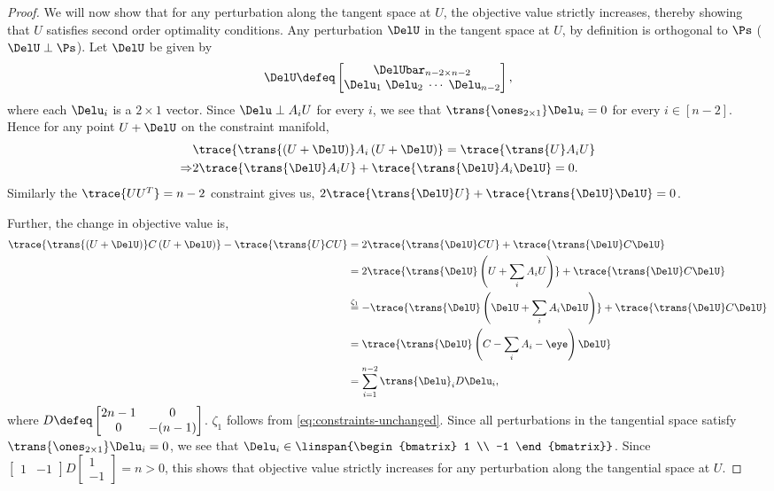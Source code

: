 \begin{proof}
We will now show that for any perturbation along the tangent space at $U$, the objective value strictly increases, thereby showing that $U$ satisfies second order optimality conditions. Any perturbation $\DelU$ in the tangent space at $U$, by definition is orthogonal to $\Ps$ ($\DelU \perp \Ps$). Let $\DelU$ be given by $$\DelU \defeq \begin{bmatrix} {\DelUbar}_{n-2 \times n-2} \\ \Delu_1 \; \Delu_2 \; \cdots \; \Delu_{n-2} \end{bmatrix},$$ where each $\Delu_i$ is a $2\times1$ vector. Since $\Delu \perp A_i U$ for every $i$, we see that $\trans{\ones_{2\times 1}}\Delu_i = 0$ for every $i \in [n-2]$. Hence for any point $U+\DelU$ on the constraint manifold,
\begin{align}
	&\trace{\trans{\left(U + \DelU\right)} A_i \left(U + \DelU\right)} = \trace{\trans{U} A_i U} \nonumber \\
	\Rightarrow & 2 \trace{\trans{\DelU} A_i U} + \trace{\trans{\DelU} A_i \DelU} = 0. \label{eq:constraints-unchanged}
\end{align} Similarly the $\trace{UU^T}=n-2$ constraint gives us, $2\trace{\trans{\DelU}U}+\trace{\trans{\DelU} \DelU}=0$.

Further, the change in objective value is,
\begin{align*}
	\trace{\trans{\left(U + \DelU \right)} C \left(U + \DelU \right)} - \trace{\trans{U}C U} &= 2 \trace{\trans{\DelU} C U} + \trace{\trans{\DelU} C \DelU} \\
	&= 2 \trace{\trans{\DelU} \left(U + \sum_i A_i U\right) } + \trace{\trans{\DelU} C \DelU} \\	
	&\stackrel{\zeta_1}{=} -\trace{\trans{\DelU} \left(\DelU + \sum_i A_i \DelU\right) } + \trace{\trans{\DelU} C \DelU} \\	
	&= \trace{\trans{\DelU} \left(C - \sum_i A_i - \eye \right) \DelU} \\
	&= \sum_{i=1}^{n-2} \trans{\Delu}_i D \Delu_i,
\end{align*}
where $D\defeq \begin{bmatrix} 2n-1 & 0 \\ 0 & -(n-1) \end{bmatrix}$. $\zeta_1$ follows from \eqref{eq:constraints-unchanged}. Since all perturbations in the tangential space satisfy $\trans{\ones_{2 \times 1}}\Delu_i=0$, we see that $\Delu_i \in \linspan{\begin{bmatrix}
	1 \\ -1
	\end{bmatrix}}$. Since $\begin{bmatrix}
1 & -1
\end{bmatrix} D \begin{bmatrix}
1 \\ -1
\end{bmatrix} = n > 0$, this shows that objective value strictly increases for any perturbation along the tangential space at $U$.
\end{proof}